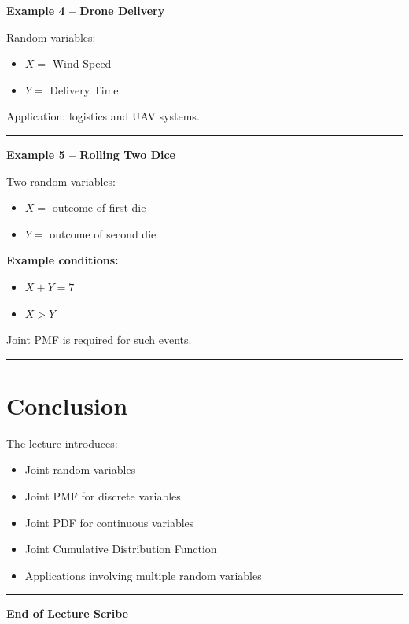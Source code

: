\documentclass[12pt]{article}
\begin{document}
\textbf{Example 4 -- Drone Delivery}

Random variables:

\begin{itemize}
\item $X =$ Wind Speed
\item $Y =$ Delivery Time
\end{itemize}

Application: logistics and UAV systems.\\
\noindent\rule{\linewidth}{0.4pt}

\textbf{Example 5 -- Rolling Two Dice}

Two random variables:

\begin{itemize}
\item $X =$ outcome of first die
\item $Y =$ outcome of second die
\end{itemize}

\textbf{Example conditions:}

\begin{itemize}
\item $X + Y = 7$
\item $X > Y$
\end{itemize}

Joint PMF is required for such events.\\
\noindent\rule{\linewidth}{0.4pt}


\section{Conclusion}

The lecture introduces:

\begin{itemize}
\item Joint random variables
\item Joint PMF for discrete variables
\item Joint PDF for continuous variables
\item Joint Cumulative Distribution Function
\item Applications involving multiple random variables
\end{itemize}
\noindent\rule{\linewidth}{0.4pt}
\begin{center}
\textbf{End of Lecture Scribe}
\end{center}
\end{document}
